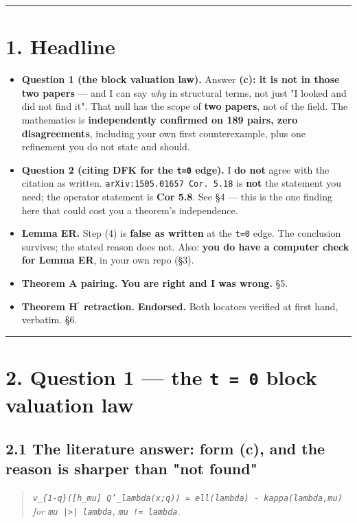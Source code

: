 \documentclass[11pt,a4paper]{article}
\begin{document}
\medskip\hrule\medskip

\section*{1. Headline}

\begin{itemize}
\item \textbf{Question 1 (the block valuation law).} Answer \textbf{(c): it is not in those two papers} --- and I can say \emph{why} in structural terms, not just "I looked and did not find it". That null has the scope of \textbf{two papers}, not of the field. The mathematics is \textbf{independently confirmed on 189 pairs, zero disagreements}, including your own first counterexample, plus one refinement you do not state and should.
\item \textbf{Question 2 (citing DFK for the \mbox{\texttt{t=0}} edge).} I \textbf{do not} agree with the citation as written. \mbox{\texttt{arXiv:1505.01657 Cor. 5.18}} is \textbf{not} the statement you need; the operator statement is \textbf{Cor 5.8}. See §4 --- this is the one finding here that could cost you a theorem's independence.
\item \textbf{Lemma ER.} Step (4) is \textbf{false as written} at the \mbox{\texttt{t=0}} edge. The conclusion survives; the stated reason does not. Also: \textbf{you do have a computer check for Lemma ER}, in your own repo (§3).
\item \textbf{Theorem A pairing.} \textbf{You are right and I was wrong.} §5.
\item \textbf{Theorem H$^{\prime}$ retraction.} \textbf{Endorsed.} Both locators verified at first hand, verbatim. §6.
\end{itemize}

\medskip\hrule\medskip

\section*{2. Question 1 --- the \mbox{\texttt{t = 0}} block valuation law}

\subsection*{2.1 The literature answer: form (c), and the reason is sharper than "not found"}

\begin{quote}\itshape \mbox{\texttt{v\_\{1-q\}([h\_mu] Q'\_lambda(x;q)) = ell(lambda) - kappa(lambda,mu)}} for \mbox{\texttt{mu |>| lambda}}, \mbox{\texttt{mu != lambda}}.\end{quote}
\end{document}
